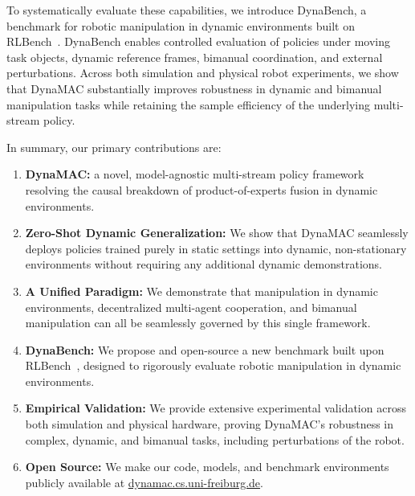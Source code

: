 \documentclass[letterpaper, 10 pt, journal, twoside]{IEEEtran}
\newcommand{\ourmethod}{DynaMAC\xspace}
\newcommand{\ourbench}{DynaBench\xspace}
\begin{document}
To systematically evaluate these capabilities, we introduce \ourbench{}, a benchmark for robotic manipulation in dynamic environments built on RLBench~\cite{james2019rlbench}.
\ourbench{} enables controlled evaluation of policies under moving task objects, dynamic reference frames, bimanual coordination, and external perturbations.
Across both simulation and physical robot experiments, we show that \ourmethod{} substantially improves robustness in dynamic and bimanual manipulation tasks while retaining the sample efficiency of the underlying multi-stream policy.

In summary, our primary contributions are:
\begin{enumerate}
    \item \textbf{\ourmethod{}:} a novel, model-agnostic multi-stream policy framework resolving the causal breakdown of product-of-experts fusion in dynamic environments.
    \item \textbf{Zero-Shot Dynamic Generalization:} We show that \ourmethod{} seamlessly deploys policies trained purely in static settings into dynamic, non-stationary environments without requiring any additional dynamic demonstrations.
    \item \textbf{A Unified Paradigm:} We demonstrate that manipulation in dynamic environments, decentralized multi-agent cooperation, and bimanual manipulation can all be seamlessly governed by this single framework.
    \item \textbf{DynaBench:} We propose and open-source a new benchmark built upon RLBench~\cite{james2019rlbench}, designed to rigorously evaluate robotic manipulation in dynamic environments.
    \item \textbf{Empirical Validation:} We provide extensive experimental validation across both simulation and physical hardware, proving \ourmethod's robustness in complex, dynamic, and bimanual tasks, including perturbations of the robot. 
    \item \textbf{Open Source:} We make our code, models, and benchmark environments publicly available at \url{dynamac.cs.uni-freiburg.de}.
\end{enumerate}
%
\end{document}
